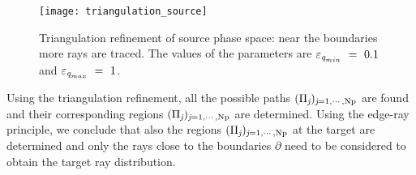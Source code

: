 \begin{figure}[h]
  \begin{center}
  \texttt{[image: triangulation\_source]}
  \end{center}
  \caption{Triangulation refinement of source phase space:
  near the boundaries more rays are traced.
    The values of the parameters are $\varepsilon_{\textit{q}_{min}}~=~ 0.1$ and $\varepsilon_{\textit{q}_{max}}~=~1$.}
   \label{fig:triangulation_refinement}
  \end{figure}
Using the triangulation refinement, all the possible paths $(\Pi_{\textit{j}})_{\textit{j} = 1, \cdots, \textrm{Np}}$ are found and their corresponding regions $(\Pi_{\textit{j}})_{\textit{j} = 1, \cdots, \textrm{Np}}$ are determined. Using the edge-ray principle, we conclude that also the regions $(\Pi_{\textit{j}})_{\textit{j} = 1, \cdots, \textrm{Np}}$ at the target are determined and only the rays close to the boundaries
$\partial$ need to be considered to obtain the target ray distribution.

